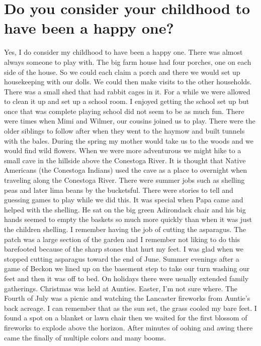 \section{Do you consider your childhood to have been a happy one?}
Yes, I do consider my childhood to have been a happy one.
There was almost always someone to play with.
The big farm house had four porches, one on each side of the house.
So we could each claim a porch and there we would set up housekeeping with our dolls.
We could then make visits to the other households.
There was a small shed that had rabbit cages in it.
For a while we were allowed to clean it up and set up a school room.
I enjoyed getting the school set up but once that was complete playing school did not seem to be as much fun.
There were times when Mimi and Wilmer, our cousins joined us to play.
There were the older siblings to follow after when they went to the haymow and built tunnels with the bales.
During the spring my mother would take us to the woods and we would find wild flowers.
When we were more adventurous we might hike to a small cave in the hillside above the Conestoga River.
It is thought that Native Americans (the Conestoga Indians) used the cave as a place to overnight when traveling along the Conestoga River.
There were summer jobs such as shelling peas and later lima beans by the bucketsful.
There were stories to tell and guessing games to play while we did this.
It was special when Papa came and helped with the shelling.
He sat on the big green Adirondack chair and his big hands seemed to empty the baskets so much more quickly than when it was just the children shelling.
I remember having the job of cutting the asparagus.
The patch was a large section of the garden and I remember not liking to do this barefooted because of the sharp stones that hurt my feet.
I was glad when we stopped cutting asparagus toward the end of June.
Summer evenings after a game of Beckon we lined up on the basement step to take our turn washing our feet and then it was off to bed.
On holidays there were usually extended family gatherings.
Christmas was held at Aunties.
Easter, I'm not sure where.
The Fourth of July was a picnic and watching the Lancaster fireworks from Auntie's back acreage.
I can remember that as the sun set, the grass cooled my bare feet.
I found a spot on a blanket or lawn chair then we waited for the first blossom of fireworks to explode above the horizon.
After minutes of oohing and awing there came the finally of multiple colors and many booms.
